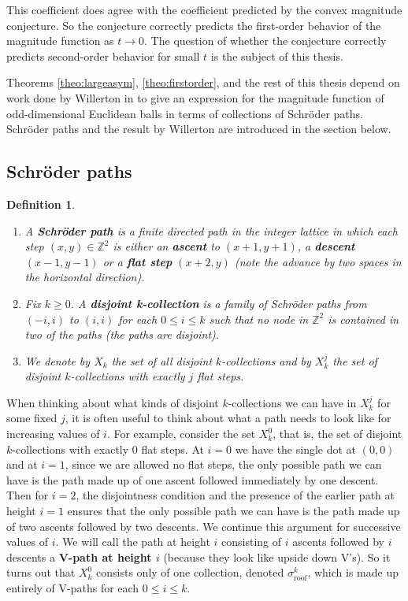 \documentclass[11pt]{article}
\newcommand{\Z}{\mathbb{Z}}
\theoremstyle{mythm}
\newtheorem{defn}{Definition}[section]
\begin{document}
This coefficient does agree with the coefficient predicted by the convex magnitude conjecture. So the conjecture correctly predicts the first-order behavior of the magnitude function as $t\to0$. The question of whether the conjecture correctly predicts second-order behavior for small $t$ is the subject of this thesis.

Theorems \ref{theo:largeasym}, \ref{theo:firstorder}, and the rest of this thesis depend on work done by Willerton in \cite{willerton_magnitude_2017} to give an expression for the magnitude function of odd-dimensional Euclidean balls in terms of collections of Schröder paths. Schröder paths and the result by Willerton are introduced in the section below.

\subsection{Schröder paths}

\begin{defn}
\begin{enumerate}[label=$\bullet$]
\item A \textbf{Schröder path} is a finite directed path in the integer lattice in which each step $(x,y)\in\Z^2$ is either an \textbf{ascent} to $(x+1,y+1)$, a \textbf{descent} $(x-1,y-1)$ or a \textbf{flat step} $(x+2,y)$ (note the advance by \emph{two} spaces in the horizontal direction).
\item Fix $k\geq0$. A \textbf{disjoint k-collection} is a family of Schröder paths from $(-i,i)$ to $(i,i)$ for each $0\leq i\leq k$ such that no node in $\Z^2$ is contained in two of the paths (the paths are disjoint).
\item We denote by $X_k$ the set of all disjoint $k$-collections and by $X_k^j$ the set of disjoint $k$-collections with exactly $j$ flat steps.
\end{enumerate}
\end{defn}

When thinking about what kinds of disjoint $k$-collections we can have in $X_k^j$ for some fixed $j$, it is often useful to think about what a path needs to look like for increasing values of $i$. For example, consider the set $X_k^0$, that is, the set of disjoint $k$-collections with exactly 0 flat steps. At $i = 0$ we have the single dot at $(0,0)$ and at $i = 1$, since we are allowed no flat steps, the only possible path we can have is the path made up of one ascent followed immediately by one descent. Then for $i = 2$, the disjointness condition and the presence of the earlier path at height $i=1$ ensures that the only possible path we can have is the path made up of two ascents followed by two descents. We continue this argument for successive values of $i$. We will call the path at height $i$ consisting of $i$ ascents followed by $i$ descents a \textbf{V-path at height $i$} (because they look like upside down V's). So it turns out that $X_k^0$ consists only of one collection, denoted $\sigma_{\text{roof}}^k$, which is made up entirely of V-paths for each $0\leq i\leq k$.
\end{document}
